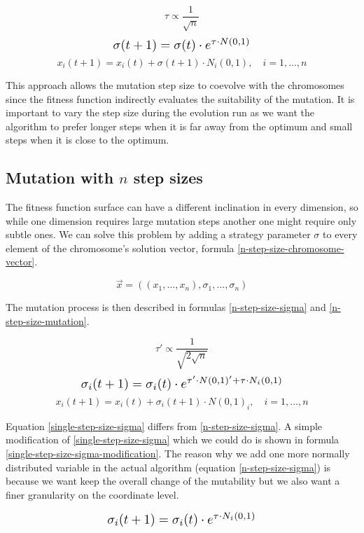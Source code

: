 \begin{equation}
    \tau \propto \frac{1}{\sqrt{n}}
\end{equation}
\begin{equation} \label{single-step-size-sigma} \scalebox{1.3}{
    $\sigma(t+1) = \sigma(t) \cdot e^{\tau \cdot N(0,1)}$
}
\end{equation}
\begin{equation} \label{single-step-size-mutation}
    x_i(t+1) = x_i(t) + \sigma(t+1) \cdot N_i(0,1), \quad i = 1,...,n
\end{equation}

This approach allows the mutation step size to coevolve with the chromosomes since the fitness function indirectly evaluates the suitability of the mutation. It is important to vary the step size during the evolution run as we want the algorithm to prefer longer steps when it is far away from the optimum and small steps when it is close to the optimum.

\subsection{Mutation with $n$ step sizes} \label{n-step}
The fitness function surface can have a different inclination in every dimension, so while one dimension requires large mutation steps another one might require only subtle ones. We can solve this problem by adding a strategy parameter $\sigma$ to every element of the chromosome's solution vector, formula \ref{n-step-size-chromosome-vector}.

 \begin{equation} \label{n-step-size-chromosome-vector}
    \vec{x} = ((x_1,...,x_n), \sigma_1,...,\sigma_n)
 \end{equation}

The mutation process is then described in formulas \ref{n-step-size-sigma} and \ref{n-step-size-mutation}.

\begin{equation}
\tau' \propto \frac{1}{\sqrt{2\sqrt{n}}}
\end{equation}
\begin{equation} \label{n-step-size-sigma} \scalebox{1.3}{
    $\sigma_i(t+1) = \sigma_i(t) \cdot e^{\tau' \cdot N(0,1)' + \tau \cdot N_i(0,1)}$
}
\end{equation}
\begin{equation} \label{n-step-size-mutation}
    x_i(t+1) = x_i(t) + \sigma_i(t+1) \cdot N(0,1)_i, \quad i = 1,...,n
\end{equation}

Equation \ref{single-step-size-sigma} differs from \ref{n-step-size-sigma}. A simple modification of \ref{single-step-size-sigma} which we could do is shown in formula \ref{single-step-size-sigma-modification}. The reason why we add one more normally distributed variable in the actual algorithm (equation \ref{n-step-size-sigma}) is because we want keep the overall change of the mutability but we also want a finer granularity on the coordinate level.

\begin{equation}\label{single-step-size-sigma-modification}
\scalebox{1.3}{
    $\sigma_i(t+1) = \sigma_i(t) \cdot e^{\tau \cdot N_i(0,1)}$
}
\end{equation}